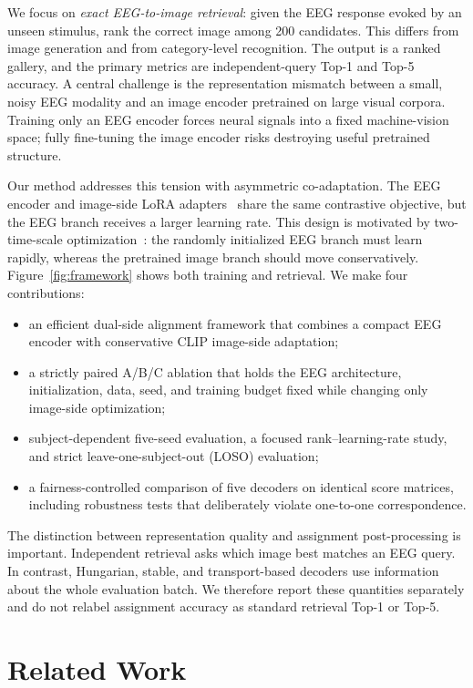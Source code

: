 \documentclass{article}
\begin{document}
We focus on \emph{exact EEG-to-image retrieval}: given the EEG response evoked by an unseen stimulus, rank the correct image among 200 candidates. This differs from image generation and from category-level recognition. The output is a ranked gallery, and the primary metrics are independent-query Top-1 and Top-5 accuracy. A central challenge is the representation mismatch between a small, noisy EEG modality and an image encoder pretrained on large visual corpora. Training only an EEG encoder forces neural signals into a fixed machine-vision space; fully fine-tuning the image encoder risks destroying useful pretrained structure.

Our method addresses this tension with asymmetric co-adaptation. The EEG encoder and image-side LoRA adapters~\citep{hu2022lora} share the same contrastive objective, but the EEG branch receives a larger learning rate. This design is motivated by two-time-scale optimization~\citep{heusel2017ttur}: the randomly initialized EEG branch must learn rapidly, whereas the pretrained image branch should move conservatively. Figure~\ref{fig:framework} shows both training and retrieval. We make four contributions:

\begin{itemize}
  \item an efficient dual-side alignment framework that combines a compact EEG encoder with conservative CLIP image-side adaptation;
  \item a strictly paired A/B/C ablation that holds the EEG architecture, initialization, data, seed, and training budget fixed while changing only image-side optimization;
  \item subject-dependent five-seed evaluation, a focused rank--learning-rate study, and strict leave-one-subject-out (LOSO) evaluation;
  \item a fairness-controlled comparison of five decoders on identical score matrices, including robustness tests that deliberately violate one-to-one correspondence.
\end{itemize}

The distinction between representation quality and assignment post-processing is important. Independent retrieval asks which image best matches an EEG query. In contrast, Hungarian, stable, and transport-based decoders use information about the whole evaluation batch. We therefore report these quantities separately and do not relabel assignment accuracy as standard retrieval Top-1 or Top-5.

\section{Related Work}
\label{sec:related}
\end{document}
